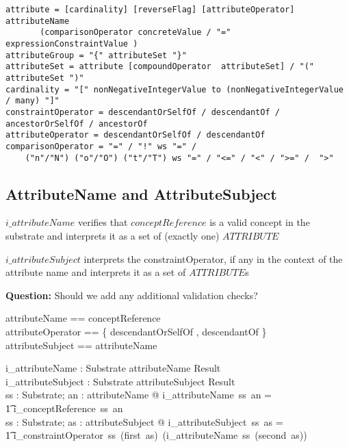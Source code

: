 \documentclass{article}
\begin{document}
\begin{verbatim}
attribute = [cardinality] [reverseFlag] [attributeOperator] attributeName 			
       (comparisonOperator concreteValue / "=" expressionConstraintValue )
attributeGroup = "{" attributeSet "}" 
attributeSet = attribute [compoundOperator  attributeSet] / "(" attributeSet ")" 
cardinality = "[" nonNegativeIntegerValue to (nonNegativeIntegerValue / many) "]" 
constraintOperator = descendantOrSelfOf / descendantOf /  ancestorOrSelfOf / ancestorOf 
attributeOperator = descendantOrSelfOf / descendantOf 
comparisonOperator = "=" / "!" ws "=" / 
    ("n"/"N") ("o"/"O") ("t"/"T") ws "=" / "<=" / "<" / ">=" /  ">"
\end{verbatim}

\subsection{AttributeName and AttributeSubject}
$i\_attributeName$ verifies that  $conceptReference$ is a valid concept in the substrate and
interprets it as a set of (exactly one) $ATTRIBUTE$

$i\_attributeSubject$ interprets the constraintOperator, if any in the context of the attribute name and
interprets it as a set of $ATTRIBUTE$s

\textbf{Question:} Should we add any additional validation checks?
\begin{zed}
attributeName == conceptReference \\
\also
attributeOperator ==  \{ descendantOrSelfOf , descendantOf \} \\
attributeSubject == \optional[attributeOperator] \cross attributeName 
\end{zed}

\begin{gendef}
   i\_attributeName : Substrate \pfun attributeName \pfun Result \\
   i\_attributeSubject : Substrate \pfun attributeSubject \pfun Result \\
\where
   \forall ss : Substrate; an : attributeName @ i\_attributeName~ss~an = \\
\t1 i\_conceptReference~ss~an \\
\also
   \forall ss : Substrate; as : attributeSubject @ i\_attributeSubject~ss~as = \\
\t1 i\_constraintOperator~ss~(first~as)~(i\_attributeName~ss~(second~as)) \\
\end{gendef}
\end{document}
